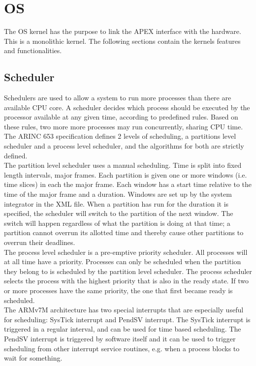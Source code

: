 \section{OS}
The OS kernel has the purpose to link the APEX interface with the hardware.
This is a monolithic kernel. The following sections contain
the kernel\textquotesingle s features and functionalities.

\subsection{Scheduler}
\label{ssec:design_scheduling}
Schedulers are used to allow a system to run more processes than there are
available CPU core. 
A scheduler decides which process should be executed by the processor available
at any given time, according to predefined rules. Based on these rules, two more
more processes may run concurrently, sharing CPU time. The ARINC 653
specification defines 2 levels of scheduling, a partitions level scheduler and a
process level scheduler, and the algorithms for both are strictly defined.\\

The partition level scheduler uses a manual scheduling. Time is split into fixed
length intervals, major frames. Each partition is given one or more windows
(i.e. time slices) in each the major frame. Each window has a start time
relative to the time of the major frame and a duration. Windows are set up by
the system integrator in the XML file.\cite{arinc_part_scheduling}
When a partition has run for the duration it is specified, the scheduler will
switch to the partition of the next window. The switch will happen regardless of
what the partition is doing at that time; a partition cannot overrun its
allotted time and thereby cause other partitions to overrun their deadlines.\\

The process level scheduler is a pre-emptive priority scheduler. All processes 
will at all time have a priority. Processes can only be scheduled when the
partition they belong to is scheduled by the partition level scheduler. The
process scheduler selects the process with the highest priority that is also
in the ready state. If two or more processes have the same priority, the one
that first became ready is scheduled.\cite{arinc_pro_scheduling}\\

The ARMv7M architecture has two special interrupts that are especially useful
for scheduling: SysTick interrupt and PendSV interrupt. The SysTick interrupt is
triggered in a regular interval, and can be used for time based scheduling. The
PendSV interrupt is triggered by software itself and it can be used to trigger 
scheduling from other interrupt service routines, e.g. when a process blocks to
wait for something.

